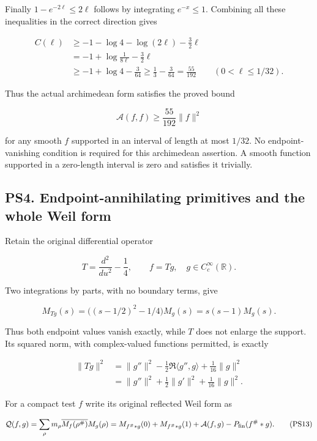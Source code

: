 \documentclass[
  10pt,
  a4paper,
]{article}
\begin{document}
Finally \(1-e^{-2\ell}\le2\ell\) follows by integrating \(e^{-x}\le1\).
Combining all these inequalities in the correct direction gives

\[
\begin{split}
C(\ell)
&\ge-1-\log4-\log(2\ell)-\frac32\ell\\
&=-1+\log\frac1{8\ell}-\frac32\ell\\
&\ge-1+\log4-\frac3{64}
\ge\frac13-\frac3{64}=\frac{55}{192}
\qquad(0<\ell\le1/32).
\end{split}
\tag{PS8}
\]

Thus the actual archimedean form satisfies the proved bound

\[
\boxed{\mathcal A(f,f)\ge\frac{55}{192}\|f\|^2}
\tag{PS9}
\]

for any smooth \(f\) supported in an interval of length at most
\(1/32\). No endpoint-vanishing condition is required for this
archimedean assertion. A smooth function supported in a zero-length
interval is zero and satisfies it trivially.

\subsection{PS4. Endpoint-annihilating primitives and the whole Weil
form}\label{ps4.-endpoint-annihilating-primitives-and-the-whole-weil-form}

Retain the original differential operator

\[
T=\frac{d^2}{du^2}-\frac14,
\qquad f=Tg,\quad g\in C_c^\infty(\mathbb R).
\tag{PS10}
\]

Two integrations by parts, with no boundary terms, give

\[
M_{Tg}(s)=\bigl((s-1/2)^2-1/4\bigr)M_g(s)
=s(s-1)M_g(s).
\tag{PS11}
\]

Thus both endpoint values vanish exactly, while \(T\) does not enlarge
the support. Its squared norm, with complex-valued functions permitted,
is exactly

\[
\begin{split}
\|Tg\|^2
&=\|g''\|^2-\frac12\Re\langle g'',g\rangle
+\frac1{16}\|g\|^2\\
&=\|g''\|^2+\frac12\|g'\|^2+\frac1{16}\|g\|^2.
\end{split}
\tag{PS12}
\]

For a compact test \(f\) write its original reflected Weil form as

\[
\mathcal Q(f,g)=\sum_\rho m_\rho
\overline{M_f(\rho^\#)}M_g(\rho)
=M_{f^\#*g}(0)+M_{f^\#*g}(1)
+\mathcal A(f,g)-P_{\rm fin}(f^\#*g).
\tag{PS13}
\]
\end{document}
